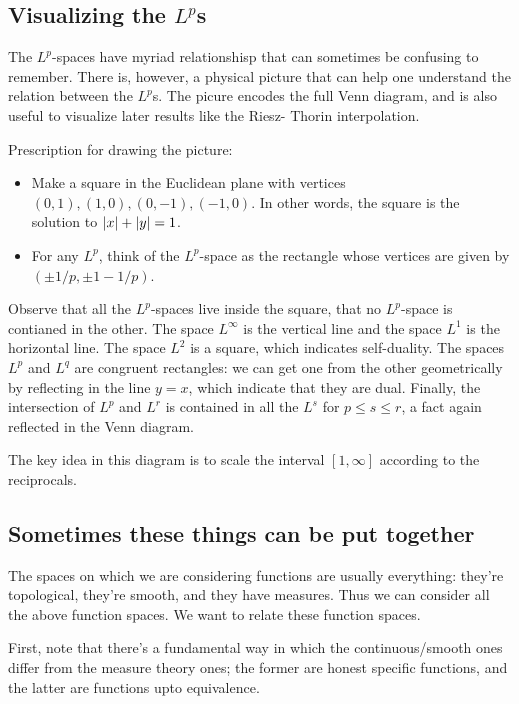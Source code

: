 \documentclass[a4paper]{amsart}
\begin{document}
\subsection{Visualizing the $L^p$s}\label{venndiagramforlps}

The $L^p$-spaces have myriad relationshisp that can sometimes be
confusing to remember. There is, however, a physical picture that can
help one understand the relation between the $L^p$s. The picure
encodes the full Venn diagram, and is also useful to visualize later
results like the Riesz- Thorin interpolation.

Prescription for drawing the picture:

\begin{itemize}

\item Make a square in the Euclidean plane with vertices $(0,1),
  (1,0), (0,-1), (-1,0)$. In other words, the square is the solution
  to $\left|x\right| + \left|y\right| = 1$.

\item For any $L^p$, think of the $L^p$-space as the rectangle whose
  vertices are given by $(\pm 1/p, \pm 1 - 1/p)$.

\end{itemize}

Observe that all the $L^p$-spaces live inside the square, that no
$L^p$-space is contianed in the other. The space $L^\infty$ is the
vertical line and the space $L^1$ is the horizontal line. The space
$L^2$ is a square, which indicates self-duality. The spaces $L^p$ and
$L^q$ are congruent rectangles: we can get one from the other
geometrically by reflecting in the line $y = x$, which indicate that
they are dual. Finally, the intersection of $L^p$ and $L^r$ is
contained in all the $L^s$ for $p \le s \le r$, a fact again reflected
in the Venn diagram.

The key idea in this diagram is to scale the interval $[1,\infty]$
according to the reciprocals.

\subsection{Sometimes these things can be put together}

The spaces on which we are considering functions are usually
everything: they're topological, they're smooth, and they have
measures. Thus we can consider all the above function spaces. We want
to relate these function spaces.

First, note that there's a fundamental way in which the
continuous/smooth ones differ from the measure theory ones; the former
are honest specific functions, and the latter are functions upto
equivalence.
\end{document}
